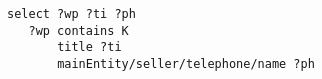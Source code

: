 
{\footnotesize
\begin{verbatim}
select ?wp ?ti ?ph
   ?wp contains K
       title ?ti
       mainEntity/seller/telephone/name ?ph
\end{verbatim}
}